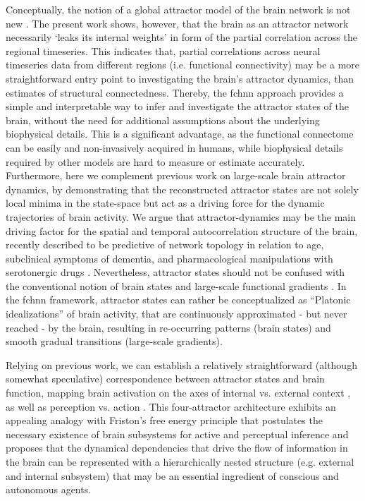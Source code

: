\documentclass{article}
\begin{document}
Conceptually, the notion of a global attractor model of the brain network is not new \citep{freeman1987simulation, deco2012ongoing, vohryzek2020ghost, deco2012anatomy, golos2015multistability, hansen2015functional}.
The present work shows, however, that the brain as an attractor network necessarily `leaks its internal weights' in form of the partial correlation across the regional timeseries. This indicates that, partial correlations across neural timeseries data from different regions (i.e. functional connectivity) may be a more straightforward entry point to investigating the brain's attractor dynamics, than estimates of structural connectedness.
Thereby, the \acrshort{fchnn} approach provides a simple and interpretable way to infer and investigate the attractor states of the brain, without the need for additional assumptions about the underlying biophysical details. This is a significant advantage, as the functional connectome can be easily and non-invasively acquired in humans, while biophysical details required by other models are hard to measure or estimate accurately.
Furthermore, here we complement previous work on large-scale brain attractor dynamics, by demonstrating that the reconstructed attractor states are not solely local minima in the state-space but act as a driving force for the dynamic trajectories of brain activity. We argue that attractor-dynamics may be the main driving factor for the spatial and temporal autocorrelation structure of the brain, recently described to be predictive of network topology in relation to age, subclinical symptoms of dementia, and pharmacological manipulations with serotonergic drugs \citep{shinn2023functional}.
Nevertheless, attractor states should not be confused with the conventional notion of brain states \citep{chen2015introducing} and large-scale functional gradients \citep{margulies2016situating}. In the \acrshort{fchnn} framework, attractor states can rather be conceptualized as ``Platonic idealizations'' of brain activity, that are continuously approximated - but never reached - by the brain, resulting in re-occurring patterns (brain states) and smooth gradual transitions (large-scale gradients).

Relying on previous work, we can establish a relatively straightforward (although somewhat speculative) correspondence between attractor states and brain function, mapping brain activation on the axes of internal vs. external context \citep{golland2008data, cioli2014differences}, as well as perception vs. action \citep{fuster2004upper}.
This four-attractor architecture exhibits an appealing analogy with Friston's free energy principle \citep{friston2006free} that postulates the necessary existence of brain subsystems for active and perceptual inference and proposes that the dynamical dependencies that drive the flow of information in the brain can be represented with a hierarchically nested structure (e.g. external and internal subsystem) that may be an essential ingredient of conscious \citep{ramstead2023inner} and autonomous \citep{lee2023life} agents.
\end{document}
